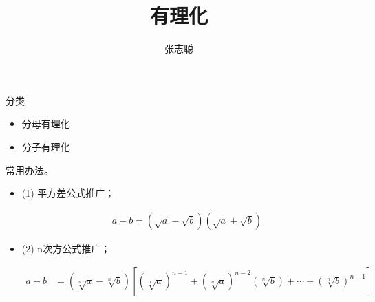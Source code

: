 \documentclass{article}
\begin{document}
\title{有理化}
\author{张志聪}
\maketitle

\begin{zremark}
  分类
\end{zremark}
\begin{itemize}
  \item 分母有理化
  \item 分子有理化
\end{itemize}


\begin{zremark}
  常用办法。
\end{zremark}

\begin{itemize}
  \item (1) 平方差公式推广；

  \begin{align*}
    a - b = (\sqrt{a} - \sqrt{b})(\sqrt{a} + \sqrt{b})
  \end{align*}
  
  \item (2) n次方公式推广；

  \begin{align*}
    a - b
    & = (\sqrt[n]{a} - \sqrt[n]{b})
    [(\sqrt[n]{a})^{n - 1} + (\sqrt[n]{a})^{n - 2}(\sqrt[n]{b})+ \cdots + (\sqrt[n]{b})^{n - 1}]
  \end{align*}
\end{itemize}
\end{document}
